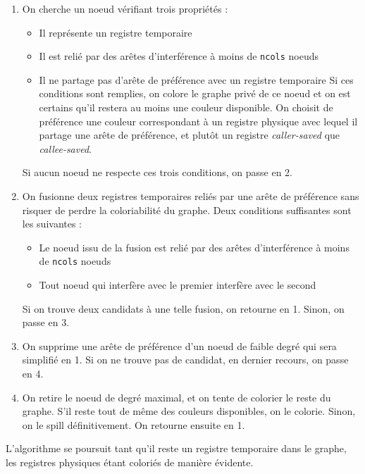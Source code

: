 \documentclass[11pt, a4paper]{article}
\newcommand{\prog}[1]{{\tt#1}}
\begin{document}
\begin{enumerate}
\item On cherche un noeud vérifiant trois propriétés :
\begin{itemize}
\item Il représente un registre temporaire
\item Il est relié par des arêtes d'interférence à moins de \prog{ncols} noeuds
\item Il ne partage pas d'arête de préférence avec un registre temporaire \newline
Si ces conditions sont remplies, on colore le graphe privé de ce noeud et on est certains qu'il restera au moins une couleur disponible. On choisit de préférence une couleur correspondant à un registre physique avec lequel il partage une arête de préférence, et plutôt un registre \emph{caller-saved} que \emph{callee-saved}.
\end{itemize}
\medskip

Si aucun noeud ne respecte ces trois conditions, on passe en 2.

\item On fusionne deux registres temporaires reliés par une arête de préférence sans risquer de perdre la coloriabilité du graphe. Deux conditions suffisantes sont les suivantes :

\begin{itemize}
\item Le noeud issu de la fusion est relié par des arêtes d'interférence à moins de \prog{ncols} noeuds
\item Tout noeud qui interfère avec le premier interfère avec le second
\end{itemize}

Si on trouve deux candidats à une telle fusion, on retourne en 1. Sinon, on passe en 3.

\item On supprime une arête de préférence d'un noeud de faible degré qui sera simplifié en 1. Si on ne trouve pas de candidat, en dernier recours, on passe en 4.

\item On retire le noeud de degré maximal, et on tente de colorier le reste du graphe. S'il reste tout de même des couleurs disponibles, on le colorie. Sinon, on le spill définitivement. On retourne ensuite en 1.
\end{enumerate}

L'algorithme se poursuit tant qu'il reste un registre temporaire dans le graphe, les registres physiques étant coloriés de manière évidente.
\end{document}
